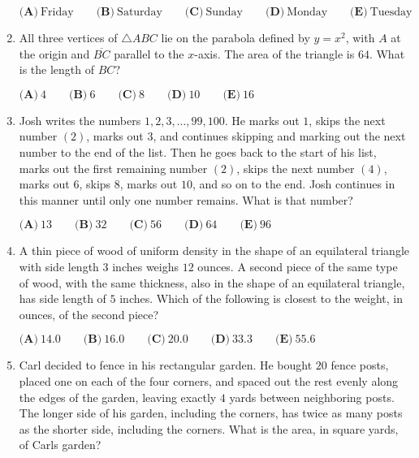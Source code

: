 \documentclass{article}
\begin{document}
\begin{enumerate}[label=\arabic*., itemsep=0.5em]
\(\textbf{(A)}\ \text{Friday} \qquad
\textbf{(B)}\ \text{Saturday} \qquad
\textbf{(C)}\ \text{Sunday} \qquad
\textbf{(D)}\ \text{Monday} \qquad
\textbf{(E)}\ \text{Tuesday} \)\par \vspace{0.5em}\item All three vertices of \(\bigtriangleup ABC\) lie on the parabola defined by \(y=x^2\), with \(A\) at the origin and \(\overline{BC}\) parallel to the \(x\)-axis. The area of the triangle is \(64\). What is the length of \(BC\)?  

\(\textbf{(A)}\ 4\qquad\textbf{(B)}\ 6\qquad\textbf{(C)}\ 8\qquad\textbf{(D)}\ 10\qquad\textbf{(E)}\ 16\)\par \vspace{0.5em}\item Josh writes the numbers \(1,2,3,\dots,99,100\). He marks out \(1\), skips the next number \((2)\), marks out \(3\), and continues skipping and marking out the next number to the end of the list. Then he goes back to the start of his list, marks out the first remaining number \((2)\), skips the next number \((4)\), marks out \(6\), skips \(8\), marks out \(10\), and so on to the end. Josh continues in this manner until only one number remains. What is that number?

\(\textbf{(A)}\ 13 \qquad
\textbf{(B)}\ 32 \qquad
\textbf{(C)}\ 56 \qquad
\textbf{(D)}\ 64 \qquad
\textbf{(E)}\ 96\)\par \vspace{0.5em}\item A thin piece of wood of uniform density in the shape of an equilateral triangle with side length \(3\) inches weighs \(12\) ounces. A second piece of the same type of wood, with the same thickness, also in the shape of an equilateral triangle, has side length of \(5\) inches. Which of the following is closest to the weight, in ounces, of the second piece?

\(\textbf{(A)}\ 14.0\qquad\textbf{(B)}\ 16.0\qquad\textbf{(C)}\ 20.0\qquad\textbf{(D)}\ 33.3\qquad\textbf{(E)}\ 55.6\)\par \vspace{0.5em}\item Carl decided to fence in his rectangular garden. He bought \(20\) fence posts, placed one on each of the four corners, and spaced out the rest evenly along the edges of the garden, leaving exactly \(4\) yards between neighboring posts. The longer side of his garden, including the corners, has twice as many posts as the shorter side, including the corners. What is the area, in square yards, of Carls garden?


\end{enumerate}
\end{document}
